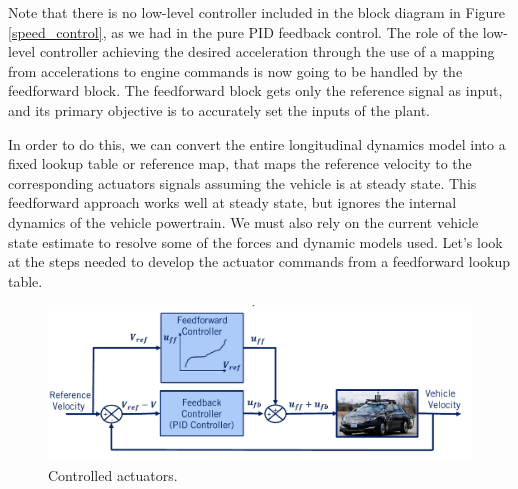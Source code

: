 Note that there is no low-level controller
included in the block diagram in Figure \ref{speed_control}, as we had in the pure PID feedback
control. The role of the low-level controller
achieving the desired acceleration through the use of a mapping from
accelerations to engine commands is now going to be handled
by the feedforward block. The feedforward block gets only
the reference signal as input, and its primary objective is to accurately
set the inputs of the plant. 

In order to  do this, we can convert the entire
longitudinal dynamics model into a fixed lookup table or reference
map, that maps the reference velocity to the corresponding actuators signals
assuming the vehicle is at steady state. This feedforward approach works
well at steady state, but ignores the internal dynamics
of the vehicle powertrain. We must also rely on the current
vehicle state estimate to resolve some of the forces and
dynamic models used. Let's look at the steps needed
to develop the actuator commands from a feedforward lookup table. 


\begin{figure}[!htb]
\begin{center}
\includegraphics[scale=0.380]{img/longitudinal_control/controlled_actuators.jpeg}
\end{center}
\caption{Controlled actuators.}
\label{controlled_actuators}
\end{figure}

